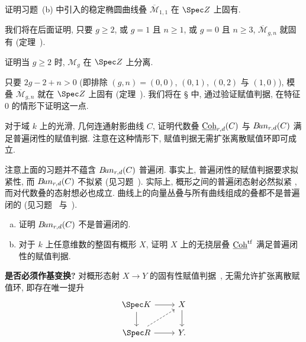 \begin{exercise}[困难]\label{src:4.8.11}
证明习题~(b) 中引入的稳定椭圆曲线叠 $\overline{\mathcal M}_{1,1}$ 在 $\Spec\mathbb Z$ 上固有.

我们将在后面证明, 只要 $g\geq2$, 或 $g=1$ 且 $n\geq1$, 或 $g=0$ 且 $n\geq3$, $\overline{\mathcal M}_{g,n}$ 就固有 (定理~).
\end{exercise}
\begin{exercise}[值得练习]\label{src:4.8.12}
证明当 $g\geq2$ 时, $\mathcal M_g$ 在 $\Spec\mathbb Z$ 上分离.
\end{exercise}
\begin{example}\label{src:4.8.13}
只要 $2g-2+n>0$ (即排除 $(g,n)=(0,0)$, $(0,1)$, $(0,2)$ 与 $(1,0)$), 模叠 $\overline{\mathcal M}_{g,n}$ 就在 $\Spec\mathbb Z$ 上固有 (定理~). 我们将在 \S{} 中, 通过验证赋值判据, 在特征 $0$ 的情形下证明这一点.
\end{example}
\begin{exercise}[值得练习]\label{src:4.8.14}
对于域 $k$ 上的光滑, 几何连通射影曲线 $C$, 证明代数叠 $\underline{\mathrm{Coh}}_{r,d}(C)$ 与 $B\!un_{r,d}(C)$ 满足普遍闭性的赋值判据. 注意在这种情形下, 赋值判据无需扩张离散赋值环即可成立.
\end{exercise}
\begin{remark}\label{src:4.8.15}
注意上面的习题并不蕴含 $B\!un_{r,d}(C)$ 普遍闭. 事实上, 普遍闭性的赋值判据要求拟紧性, 而 $B\!un_{r,d}(C)$ 不拟紧 (见习题~). 实际上, 概形之间的普遍闭态射必然拟紧 \cite[Tag 04XU]{SP}, 而对代数叠的态射想必也成立. 曲线上的向量丛叠与所有曲线组成的叠都不是普遍闭的 (见习题~ 与~).
\end{remark}
\begin{exercise}\label{src:4.8.16}
\begin{enumerate}[(a)]
\item 证明 $B\!un_{r,d}(C)$ 不是普遍闭的.
\item 对于 $k$ 上任意维数的整固有概形 $X$, 证明 $X$ 上的无挠层叠 $\underline{\mathrm{Coh}}^{\mathrm{tf}}$ 满足普遍闭性的赋值判据.
\end{enumerate}
\end{exercise}
\textbf{是否必须作基变换?} 对概形态射 $X\to Y$ 的固有性赋值判据~, 无需允许扩张离散赋值环, 即存在唯一提升
\[
\begin{tikzcd}
\Spec K\arrow[r]\arrow[d]&X\arrow[d]\\
\Spec R\arrow[r]\arrow[ur,dashed]&Y.
\end{tikzcd}
\]
